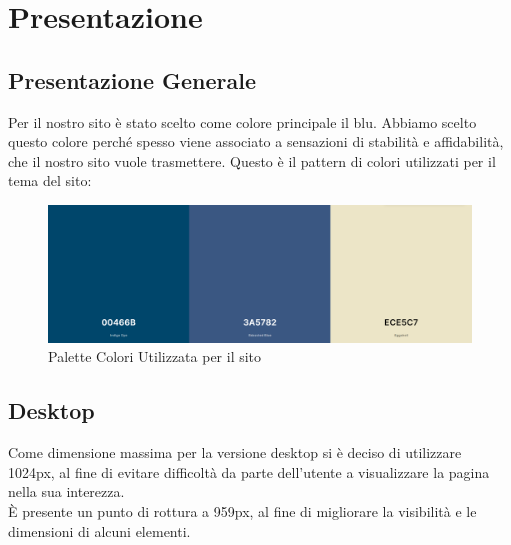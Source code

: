 \section{Presentazione}

  \subsection{Presentazione Generale}
    Per il nostro sito è stato scelto come colore principale il blu. Abbiamo scelto questo colore perché spesso viene associato a sensazioni di stabilità e affidabilità, che il nostro sito vuole trasmettere. 
    Questo è il pattern di colori utilizzati per il tema del sito:
    \begin{figure}[h]
      \includegraphics[scale=0.4]{Images/ColoriPaginaWeb.png}
      \caption{Palette Colori Utilizzata per il sito}
      \centering
    \end{figure}

  \subsection{Desktop}
    Come dimensione massima per la versione desktop si è deciso di utilizzare 1024px, al fine di evitare difficoltà da parte dell'utente a visualizzare la pagina nella sua interezza. \\
    È presente un punto di rottura a 959px, al fine di migliorare la visibilità e le dimensioni di alcuni elementi.

